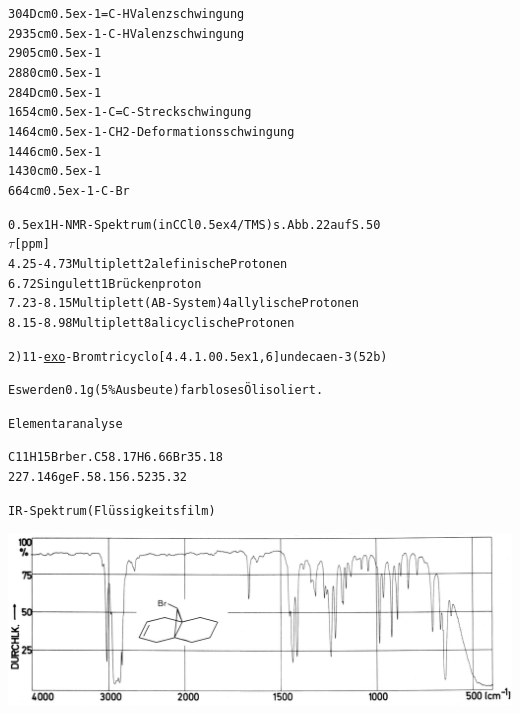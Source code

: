 \documentclass[a4paper,11pt]{article}
\begin{document}
\begin{alltt}

304D cm\raise0.5ex\hbox{-1} =C-H  Valenzschwingung
2935 cm\raise0.5ex\hbox{-1} -C-H  Valenzschwingung
2905 cm\raise0.5ex\hbox{-1}
2880 cm\raise0.5ex\hbox{-1}
284D cm\raise0.5ex\hbox{-1}
1654 cm\raise0.5ex\hbox{-1} -C=C- Streckschwingung
1464 cm\raise0.5ex\hbox{-1} -CH2- Deformationsschwingung
1446 cm\raise0.5ex\hbox{-1}
1430 cm\raise0.5ex\hbox{-1}
 664 cm\raise0.5ex\hbox{-1} -C-Br

\leavevmode\raise0.5ex\hbox{1}H-NMR-Spektrum (in CCl\lower0.5ex\hbox{4}/TMS) s. Abb. 22 auf S. 50
  \(\tau\) [ppm]
4.25 - 4.73  Multiplett                  2 alefinische Protonen
6.72         Singulett                   1 Brückenproton
7.23 - 8.15  Multiplett (AB-System)      4 allylische Protonen
8.15 - 8.98  Multiplett                  8 alicyclische Protonen


2) 11-\underline{exo}-Bromtricyclo[4.4.1.0\raise0.5ex\hbox{1,6}]undecaen-3 (52b)

Es werden 0.1 g (5 \% Ausbeute) farbloses Öl isoliert.

Elementaranalyse

C11H15Br ber. C 58.17 H 6.66 Br 35.18
227.146  geF.   58.15   6.52    35.32

\newpage
 


IR-Spektrum (Flüssigkeitsfilm)
\end{alltt}
\hspace*{-0.5cm}\includegraphics[width=14.95cm]{IR_049}
\end{document}
